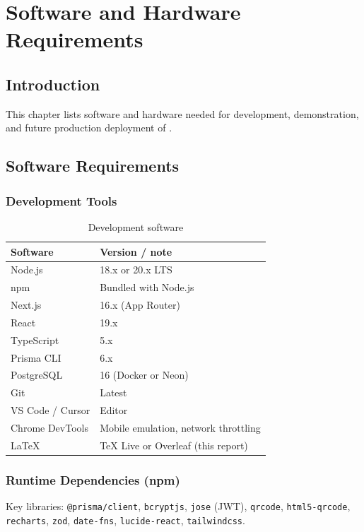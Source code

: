 \chapter{Software and Hardware Requirements}

\section{Introduction}
This chapter lists software and hardware needed for development, demonstration, and future production deployment of \ShortTitle{}.

\section{Software Requirements}

\subsection{Development Tools}
\begin{table}[H]
  \centering
  \caption{Development software}
  \tablebodysetup
  \begin{tabularx}{\textwidth}{@{}l Y@{}}
    \toprule
    \textbf{Software} & \textbf{Version / note} \\
    \midrule
    Node.js & 18.x or 20.x LTS \\
    npm & Bundled with Node.js \\
    Next.js & 16.x (App Router) \\
    React & 19.x \\
    TypeScript & 5.x \\
    Prisma CLI & 6.x \\
    PostgreSQL & 16 (Docker or Neon) \\
    Git & Latest \\
    VS Code / Cursor & Editor \\
    Chrome DevTools & Mobile emulation, network throttling \\
    \LaTeX{} & TeX Live or Overleaf (this report) \\
    \bottomrule
  \end{tabularx}
\end{table}

\subsection{Runtime Dependencies (npm)}
Key libraries: \texttt{@prisma/client}, \texttt{bcryptjs}, \texttt{jose} (JWT), \texttt{qrcode}, \texttt{html5-qrcode}, \texttt{recharts}, \texttt{zod}, \texttt{date-fns}, \texttt{lucide-react}, \texttt{tailwindcss}.

